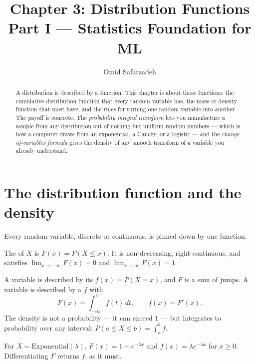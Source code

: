 \documentclass[11pt]{article}
\title{Chapter 3: Distribution Functions \\ \large Part I --- Statistics Foundation for ML}
\author{Omid Safarzadeh}
\date{}
\begin{document}
\maketitle

\begin{abstract}
\noindent
A distribution is described by a function. This chapter is about those
functions: the cumulative distribution function that every random variable
has, the mass or density function that most have, and the rules for turning
one random variable into another. The payoff is concrete. The
\emph{probability integral transform} lets you manufacture a sample from any
distribution out of nothing but uniform random numbers --- which is how a
computer draws from an exponential, a Cauchy, or a logistic --- and the
\emph{change-of-variables formula} gives the density of any smooth transform
of a variable you already understand.
\end{abstract}

\tableofcontents

\section{The distribution function and the density}

Every random variable, discrete or continuous, is pinned down by one
function.

\begin{definition}
The  of $X$ is $F(x) = P(X \le x)$. It is non-decreasing,
right-continuous, and satisfies $\lim_{x\to-\infty}F(x)=0$ and
$\lim_{x\to\infty}F(x)=1$.
\end{definition}

A  variable is described by its  $f(x)=P(X=x)$, and $F$ is a sum of jumps. A 
variable is described by a  $f$ with
\[
  F(x) = \int_{-\infty}^{x} f(t)\,dt, \qquad f(x) = F'(x).
\]
The density is not a probability --- it can exceed $1$ --- but integrates to
probability over any interval: $P(a \le X \le b) = \int_a^b f$.

\begin{example}[Exponential]
For $X \sim \mathrm{Exponential}(\lambda)$, $F(x) = 1 - e^{-\lambda x}$ and
$f(x) = \lambda e^{-\lambda x}$ for $x \ge 0$. Differentiating $F$ returns
$f$, as it must.
\end{example}
\end{document}
